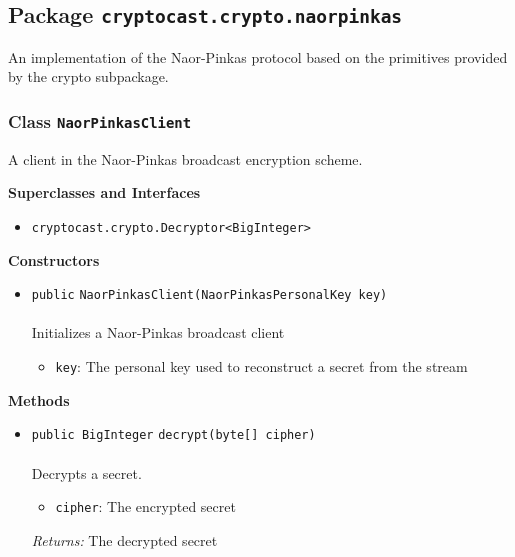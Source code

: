 \subsection{Package \lstinline!cryptocast.crypto.naorpinkas!}
An implementation of the Naor-Pinkas protocol based on the primitives provided by the crypto
 subpackage.
\subsubsection{Class \lstinline|NaorPinkasClient|}
A client in the Naor-Pinkas broadcast encryption scheme. \\
\noindent\begin{minipage}[t]{5cm}
\vspace{0.3em}
\hspace*{2em}
\vspace{0.3em}
\end{minipage}



\textbf{\sffamily Superclasses and Interfaces}
\begin{itemize}
\item \lstinline|cryptocast.crypto.Decryptor<BigInteger>|
\end{itemize}


\textbf{\sffamily Constructors}
\begin{itemize}
\item \lstinline|public| \lstinline|NaorPinkasClient|\lstinline|(NaorPinkasPersonalKey key)|\\ \\[-0.6em]
Initializes a Naor-Pinkas broadcast client
\begin{itemize}
\item \lstinline|key|: The personal key used to reconstruct a secret from the stream
\end{itemize}



\end{itemize}


\textbf{\sffamily Methods}
\begin{itemize}
\item \lstinline|public BigInteger| \lstinline|decrypt|\lstinline|(byte[] cipher)|\\ \\[-0.6em]
Decrypts a secret.
\begin{itemize}
\item \lstinline|cipher|: The encrypted secret
\end{itemize}

\emph{Returns:} The decrypted secret

\end{itemize}

